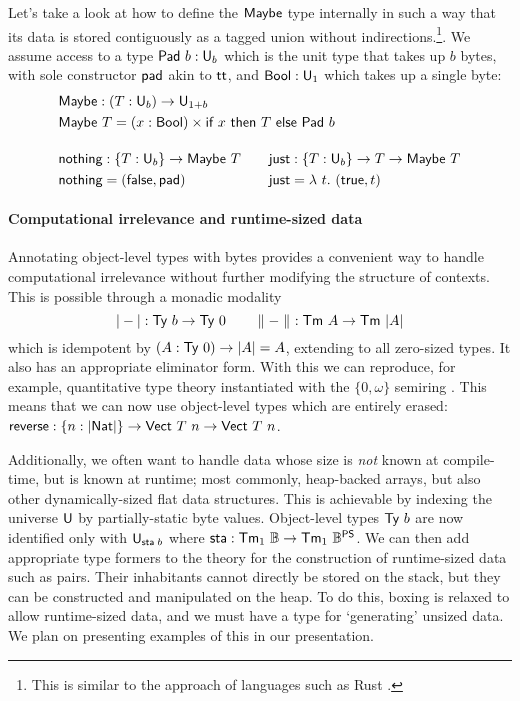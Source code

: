 Let's take a look at how to define the \(\textsf{Maybe}\) type internally in
such a way that its data is stored contiguously as a tagged union without indirections.\footnote{This
	is similar to the approach of languages such as Rust \cite{rust-option}.}.
We assume access to a type $\textsf{Pad}\ b : \textsf{U}_b$ which is the unit
type that takes up $b$ bytes, with sole constructor $\textsf{pad}$ akin to
$\textsf{tt}$, and $\textsf{Bool} : \textsf{U}_1$ which takes up a single byte:
\[
	\begin{aligned}
		 & \syn{Maybe} : (T : \univ_b) \to \univ_{1 + b}                                                                            \\
		 & \syn{Maybe}\ T = (x : \syn{Bool}) \times \syn{if}\ x\ \syn{then}\ T\ \syn{else}\ \syn{Pad}\ b                            \\[1em]
		 & \begin{alignedat}{2}
			    & \syn{nothing} : \{T : \univ_b\} \to \syn{Maybe}\ T  \qquad &  & \syn{just} : \{T : \univ_b\} \to T \to \syn{Maybe}\ T \\
			    & \syn{nothing} = (\syn{false}, \syn{pad})                   &  & \syn{just} = \lambda\ t.\  (\syn{true}, t)
		   \end{alignedat}
	\end{aligned}
\]

\paragraph{Computational irrelevance and runtime-sized data}

Annotating object-level types with bytes provides a convenient way to handle computational
irrelevance without further modifying the structure of contexts. This is possible through
a monadic modality
\[
	| - | : \textsf{Ty}\ b \to \textsf{Ty}\ 0 \qquad \parallel - \parallel\ : \textsf{Tm}\ A \to \textsf{Tm}\ | A |
\]
which is idempotent by $(A : \textsf{Ty}\ 0) \to | A | = A$, extending to all zero-sized types.
It also has an appropriate eliminator form.
With this we can
reproduce, for example, quantitative type theory instantiated with the $\{0,\omega\}$ semiring
\cite{Atkey2018-pj}. This means that we can now use object-level types which are
entirely erased: $\textsf{reverse} : \{n : | \textsf{Nat} |\} \to \textsf{Vect}\ T\ n \to \textsf{Vect}\ T\ n$.

Additionally, we often want to handle data whose size is \emph{not} known at
compile-time, but is known at runtime; most commonly, heap-backed arrays, but
also other dynamically-sized flat data structures. This is achievable by
indexing the universe $\textsf{U}$ by partially-static \cite{Yallop2018-zw} byte
values. Object-level types $\textsf{Ty}\ b$ are now identified only with
$\textsf{U}_{\textsf{sta}\;b}$ where $\textsf{sta} : \textsf{Tm}_1\ \mathbb{B} \to \textsf{Tm}_1\
	\mathbb{B}^{\textsf{PS}}$. We can then add appropriate type formers to the theory
for the construction of runtime-sized data such as pairs. Their inhabitants
cannot directly be stored on the stack, but they can be constructed and
manipulated on the heap. To do this, boxing is relaxed to allow runtime-sized
data, and we must have a type for `generating' unsized data. We plan on presenting
examples of this in our presentation.

